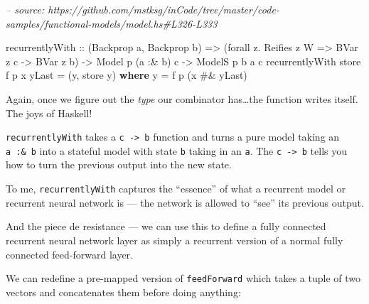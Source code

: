 \documentclass[]{article}
\newenvironment{Shaded}{}{}
\newcommand{\CommentTok}[1]{\textcolor[rgb]{0.38,0.63,0.69}{\textit{#1}}}
\newcommand{\DataTypeTok}[1]{\textcolor[rgb]{0.56,0.13,0.00}{#1}}
\newcommand{\FunctionTok}[1]{\textcolor[rgb]{0.02,0.16,0.49}{#1}}
\newcommand{\KeywordTok}[1]{\textcolor[rgb]{0.00,0.44,0.13}{\textbf{#1}}}
\newcommand{\NormalTok}[1]{#1}
\newcommand{\OtherTok}[1]{\textcolor[rgb]{0.00,0.44,0.13}{#1}}
\begin{document}
\begin{Shaded}
\begin{Highlighting}[]
\CommentTok{-- source: https://github.com/mstksg/inCode/tree/master/code-samples/functional-models/model.hs#L326-L333}

\NormalTok{recurrentlyWith}
\OtherTok{    ::}\NormalTok{ (}\DataTypeTok{Backprop}\NormalTok{ a, }\DataTypeTok{Backprop}\NormalTok{ b)}
    \OtherTok{=>}\NormalTok{ (forall z}\FunctionTok{.} \DataTypeTok{Reifies}\NormalTok{ z }\DataTypeTok{W} \OtherTok{=>} \DataTypeTok{BVar}\NormalTok{ z c }\OtherTok{->} \DataTypeTok{BVar}\NormalTok{ z b)}
    \OtherTok{->} \DataTypeTok{Model}\NormalTok{  p   (a }\FunctionTok{:&}\NormalTok{ b) c}
    \OtherTok{->} \DataTypeTok{ModelS}\NormalTok{ p b  a       c}
\NormalTok{recurrentlyWith store f p x yLast }\FunctionTok{=}\NormalTok{ (y, store y)}
  \KeywordTok{where}
\NormalTok{    y }\FunctionTok{=}\NormalTok{ f p (x }\FunctionTok{#&}\NormalTok{ yLast)}
\end{Highlighting}
\end{Shaded}

Again, once we figure out the \emph{type} our combinator has\ldots{}the function
writes itself. The joys of Haskell!

\texttt{recurrentlyWith} takes a \texttt{c\ -\textgreater{}\ b} function and
turns a pure model taking an \texttt{a\ :\&\ b} into a stateful model with state
\texttt{b} taking in an \texttt{a}. The \texttt{c\ -\textgreater{}\ b} tells you
how to turn the previous output into the new state.

To me, \texttt{recurrentlyWith} captures the ``essence'' of what a recurrent
model or recurrent neural network is --- the network is allowed to ``see'' its
previous output.

And the piece de resistance --- we can use this to define a fully connected
recurrent neural network layer as simply a recurrent version of a normal fully
connected feed-forward layer.

We can redefine a pre-mapped version of \texttt{feedForward} which takes a tuple
of two vectors and concatenates them before doing anything:
\end{document}
